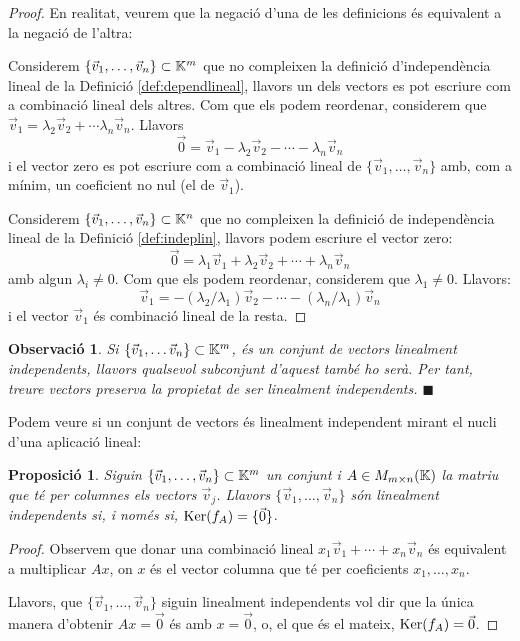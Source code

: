 \documentclass[
  11pt,
]{book}
\numberwithin{dummy}{section}
\theoremstyle{maincolornumbox}
\newtheorem{remarkT}{Observació}[chapter]
\theoremstyle{blacknumex}
\theoremstyle{blacknumbox}
\theoremstyle{maincolornum}
\newtheorem{propositionT}{Proposició}[chapter]
\newenvironment{proposition}{\begin{pBox}\begin{propositionT}}{\end{propositionT}\end{pBox}}
\newenvironment{remark}{\begin{remarkT}}{\hfill{\tiny\ensuremath{\blacksquare}}\end{remarkT}}
\begin{document}
\begin{proof}
En realitat, veurem que la negació d'una de les definicions és
equivalent a la negació de l'altra:

Considerem \(\{\vec v_1, \dots , \vec v_n\} \subset \mathbb{K}^m\) que no
compleixen la definició d'independència lineal de la Definició
\ref{def:dependlineal}, llavors un dels vectors es pot escriure
com a combinació lineal dels altres. Com que els podem reordenar,
considerem que \(\vec v_1=\lambda_2\vec v_2+\cdots \lambda_n\vec v_n\).
Llavors
\[\vec 0 = \vec v_1- \lambda_2 \vec v_2 - \cdots -\lambda_n\vec v_n\] i
el vector zero es pot escriure com a combinació lineal de
\(\{\vec v_1, \dots , \vec v_n\}\) amb, com a mínim, un coeficient no nul
(el de \(\vec v_1\)).

Considerem \(\{\vec v_1, \dots , \vec v_n\} \subset \mathbb{K}^n\) que no
compleixen la definició de independència lineal de la Definició
\ref{def:indeplin}, llavors podem escriure el vector zero:
\[\vec 0 = \lambda_1\vec v_1+ \lambda_2 \vec v_2 + \cdots +\lambda_n\vec v_n\]
amb algun \(\lambda_i\neq 0\). Com que els podem reordenar, considerem que
\(\lambda_1\neq 0\). Llavors:
\[\vec v_1 = -(\lambda_2/\lambda_1) \vec v_2 - \cdots -(\lambda_n/\lambda_1)\vec v_n\]
i el vector \(\vec v_1\) és combinació lineal de la resta.
\end{proof}

\begin{remark}
Si
\(\{\vec v_1, \dots \vec v_n\}\subset \mathbb{K}^m\), és un conjunt de vectors
linealment independents, llavors qualsevol subconjunt d'aquest també ho
serà. Per tant, treure vectors preserva la propietat de ser linealment
independents.
\end{remark}

Podem veure si un conjunt de vectors és linealment independent mirant el
nucli d'una aplicació lineal:

\begin{proposition}
Siguin \(\{\vec v_1, \dots, \vec v_n\}\subset \mathbb{K}^m\) un conjunt i
\(A\in M_{m\times n}(\mathbb{K})\) la matriu que té per columnes els vectors
\(\vec v_j\). Llavors \(\{\vec v_1, \dots, \vec v_n\}\) són linealment
independents si, i només si, \(\operatorname{Ker}(f_A)=\{\vec 0\}\).
\end{proposition}

\begin{proof}
Observem que donar una combinació lineal
\(x_1\vec v_1+ \cdots+x_n \vec v_n\) és equivalent a multiplicar \(Ax\), on
\(x\) és el vector columna que té per coeficients \(x_1, \dots, x_n\).

Llavors, que \(\{\vec v_1, \dots, \vec v_n\}\) siguin linealment
independents vol dir que la única manera d'obtenir \(Ax=\vec 0\) és amb
\(x=\vec 0\), o, el que és el mateix, \(\operatorname{Ker}(f_A)=\vec 0\).
\end{proof}
\end{document}
